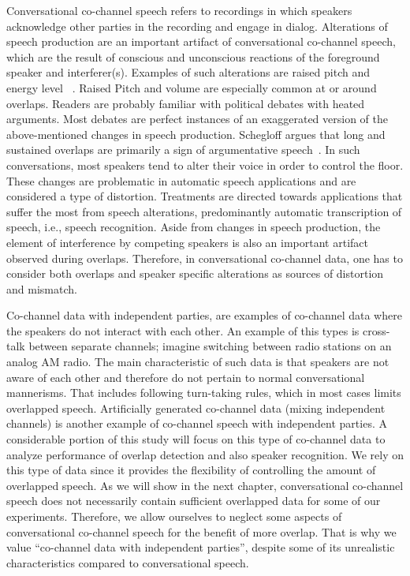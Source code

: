 Conversational co-channel speech refers to recordings in which speakers acknowledge other parties in the recording and engage in dialog. 
Alterations of speech production are an important artifact of conversational co-channel speech, which are the result of conscious and unconscious reactions of the foreground speaker and interferer(s). 
Examples of such alterations are raised pitch and energy level ~\cite{Shriberg01observationson,schegloff2000overlapping}. 
Raised Pitch and volume are especially common at or around overlaps. 
Readers are probably familiar with political debates with heated arguments. 
Most debates are perfect instances of an exaggerated version of the above-mentioned changes in speech production. 
Schegloff argues that long and sustained overlaps are primarily a sign of argumentative speech~\cite{schegloff2000overlapping}. 
In such conversations, most speakers tend to alter their voice in order to control the floor. 
These changes are problematic in automatic speech applications and are considered a type of distortion. 
Treatments are directed towards applications that suffer the most from speech alterations, predominantly automatic transcription of speech, i.e., speech recognition. 
Aside from changes in speech production, the element of interference by competing speakers is also an important artifact observed during overlaps. 
Therefore, in conversational co-channel data, one has to consider both overlaps and speaker specific alterations as sources of distortion and mismatch. 

Co-channel data with independent parties, are examples of co-channel data where the speakers do not interact with each other. 
An example of this types is cross-talk between separate channels; imagine switching between radio stations on an analog AM radio. 
The main characteristic of such data is that speakers are not aware of each other and therefore do not pertain to normal conversational mannerisms. 
That includes following turn-taking rules, which in most cases limits overlapped speech. 
Artificially generated co-channel data (mixing independent channels) is another example of co-channel speech with independent parties. 
A considerable portion of this study will focus on this type of co-channel data to analyze performance of overlap detection and also speaker recognition. 
We rely on this type of data since it provides the flexibility of controlling the amount of overlapped speech. 
As we will show in the next chapter, conversational co-channel speech does not necessarily contain sufficient overlapped data for some of our experiments. 
Therefore, we allow ourselves to neglect some aspects of conversational co-channel speech for the benefit of more overlap. 
That is why we value ``co-channel data with independent parties'', despite some of its unrealistic characteristics compared to conversational speech. 

